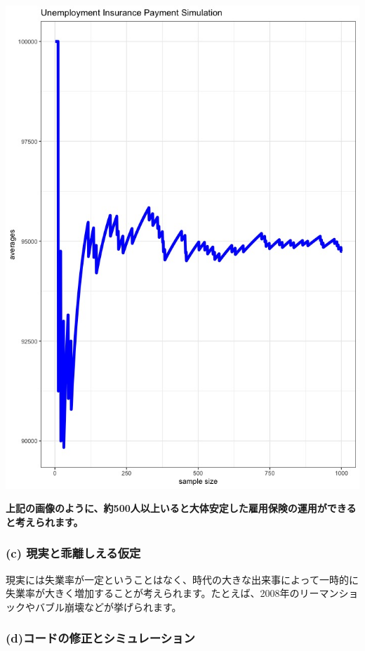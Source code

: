 \documentclass[
]{article}
\begin{document}
\includegraphics{./result/unemployment-insurance-payment-simulation.jpeg}

\textbf{上記の画像のように、約500人以上いると大体安定した雇用保険の運用ができると考えられます。}

\hypertarget{c-ux73feux5b9fux3068ux4e56ux96e2ux3057ux3048ux308bux4eeeux5b9a}{%
\subsubsection{(c)
現実と乖離しえる仮定}\label{c-ux73feux5b9fux3068ux4e56ux96e2ux3057ux3048ux308bux4eeeux5b9a}}

現実には失業率が一定ということはなく、時代の大きな出来事によって一時的に失業率が大きく増加することが考えられます。たとえば、2008年のリーマンショックやバブル崩壊などが挙げられます。

\hypertarget{dux30b3ux30fcux30c9ux306eux4feeux6b63ux3068ux30b7ux30dfux30e5ux30ecux30fcux30b7ux30e7ux30f3}{%
\subsubsection{(d)コードの修正とシミュレーション}\label{dux30b3ux30fcux30c9ux306eux4feeux6b63ux3068ux30b7ux30dfux30e5ux30ecux30fcux30b7ux30e7ux30f3}}
\end{document}
